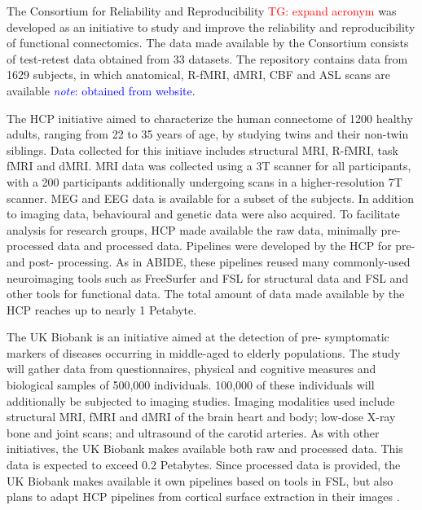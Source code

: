 \documentclass{report}
\newcommand{\note}[1]{\textcolor{blue}{\textit{note}: #1}}
\newcommand{\tristan}[1]{\textcolor{red}{TG: #1}}
\begin{document}
            The Consortium for Reliability and Reproducibility 
            \tristan{expand acronym} was developed as an initiative to study 
            and improve the 
            reliability and reproducibility of functional connectomics. The 
            data made available by the Consortium consists of test-retest data 
            obtained from 33 datasets. The repository contains data from 1629 
            subjects, in which anatomical, R-fMRI, dMRI, CBF and ASL scans are 
            available \note{obtained from website}.


            The HCP initiative aimed to characterize the human connectome of 
            1200 healthy adults, ranging from 22 to 35 years of age, by studying
            twins and their non-twin siblings. Data collected for this initiave
            includes structural MRI, R-fMRI, task fMRI and dMRI. MRI data was
            collected using a 3T scanner for all participants, with a 200 
            participants additionally undergoing scans in a higher-resolution 7T
            scanner. MEG and EEG data is available for a subset of the subjects. 
            In addition to imaging data, behavioural and genetic data were also 
            acquired. To facilitate analysis for research groups, HCP made 
            available the raw data, minimally pre-processed data and processed 
            data. Pipelines were developed by the HCP for pre- and post-
            processing. As in ABIDE, these pipelines reused many commonly-used
            neuroimaging tools such as FreeSurfer and FSL for structural data
            and FSL and other tools for functional data. The total amount of
            data made available by the HCP reaches up to nearly 1 Petabyte.


            The UK Biobank is an initiative aimed at the detection of pre-
            symptomatic markers of diseases occurring in middle-aged to elderly 
            populations. The study will gather data from questionnaires, 
            physical and cognitive measures and biological samples of 500,000
            individuals. 100,000 of these individuals will additionally be 
            subjected to imaging studies. Imaging modalities used include
            structural MRI, fMRI and dMRI of the brain heart and body; low-dose
            X-ray bone and joint scans; and ultrasound of the carotid arteries.
            As with other initiatives, the UK Biobank makes available both 
            raw and processed data. This data is expected to exceed 0.2 
            Petabytes. Since processed data is provided, the UK Biobank makes 
            available it own pipelines based on tools in FSL, but also plans to
            adapt HCP pipelines from cortical surface extraction in their images
            .
\end{document}
